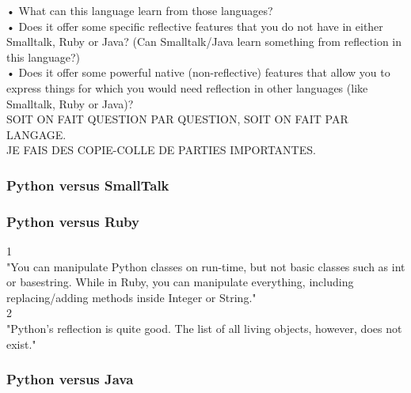 •	What can this language learn from those languages?\\
•	Does it offer some specific reflective features that you do not have in either Smalltalk, Ruby or Java? (Can Smalltalk/Java learn something from reflection in this language?)\\
•	Does it offer some powerful native (non-reflective) features that allow you to express things for which you would need reflection in other languages (like Smalltalk, Ruby or Java)?\\

SOIT ON FAIT QUESTION PAR QUESTION, SOIT ON FAIT PAR LANGAGE.\\
JE FAIS DES COPIE-COLLE DE PARTIES IMPORTANTES.\\
\subsubsection{Python versus SmallTalk}

\subsubsection{Python versus Ruby}
1\\
"You can manipulate Python classes on run-time, but not basic classes such as int or basestring. While in Ruby, you can manipulate everything, including replacing/adding methods inside Integer or String."\\
2\\
"Python's reflection is quite good. The list of all living objects, however, does not exist."\\

\subsubsection{Python versus Java}
